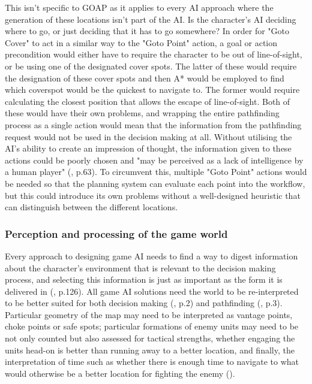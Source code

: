 \documentclass[10pt]{article}
\begin{document}
This isn't specific to GOAP as it applies to every AI approach where the generation of these locations isn't part of the AI. Is the character's AI deciding where to go, or just deciding that it has to go somewhere? In order for "Goto Cover" to act in a similar way to the "Goto Point" action, a goal or action precondition would either have to require the character to be out of line-of-sight, or be using one of the designated cover spots. The latter of these would require the designation of these cover spots and then A* would be employed to find which coverspot would be the quickest to navigate to. The former would require calculating the closest position that allows the escape of line-of-sight. Both of these would have their own problems, and wrapping the entire pathfinding process as a single action would mean that the information from the pathfinding request would not be used in the decision making at all. Without utilising the AI's ability to create an impression of thought, the information given to these actions could be poorly chosen and "may be perceived as a lack of intelligence by a human player" (\cite{graham2003pathfinding}, p.63). To circumvent this, multiple "Goto Point" actions would be needed so that the planning system can evaluate each point into the workflow, but this could introduce its own problems without a well-designed heuristic that can distinguish between the different locations.

\subsubsection{Perception and processing of the game world}

Every approach to designing game AI needs to find a way to digest information about the character's environment that is relevant to the decision making process, and selecting this information is just as important as the form it is delivered in (\cite{cui2011based}, p.126). All game AI solutions need the world to be re-interpreted to be better suited for both decision making (\cite{buro2004call}, p.2) and pathfinding (\cite{diller2004behavior}, p.3). Particular geometry of the map may need to be interpreted as vantage points, choke points or safe spots; particular formations of enemy units may need to be not only counted but also assessed for tactical strengths, whether engaging the units head-on is better than running away to a better location, and finally, the interpretation of time such as whether there is enough time to navigate to what would otherwise be a better location for fighting the enemy (\cite{buro2004call}).
\end{document}
